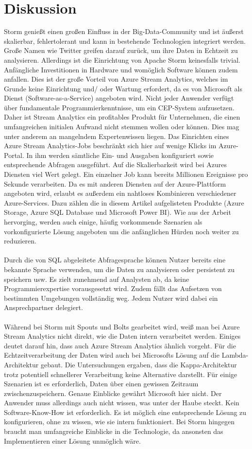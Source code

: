 \section{Diskussion}
Storm genießt einen großen Einfluss in der Big-Data-Community und ist äußerst skalierbar, fehlertolerant und kann in bestehende Technologien integriert werden. Große Namen wie Twitter greifen darauf zurück, um ihre Daten in Echtzeit zu analysieren. Allerdings ist die Einrichtung von Apache Storm keinesfalls trivial. Anfängliche Investitionen in Hardware und womöglich Software können zudem anfallen. Dies ist der große Vorteil von Azure Stream Analytics, welches im Grunde keine Einrichtung und/ oder Wartung erfordert, da es von Microsoft als Dienst (Software-as-a-Service) angeboten wird. Nicht jeder Anwender verfügt über fundamentale Programmierkenntnisse, um ein CEP-System aufzusetzen. Daher ist Stream Analytics ein profitables Produkt für Unternehmen, die einen umfangreichen initialen Aufwand nicht stemmen wollen oder können. Dies mag unter anderem an mangelndem Expertenwissen liegen. Das Einrichten eines Azure Stream Analytics-Jobs beschränkt sich hier auf wenige Klicks im Azure-Portal. In ihm werden sämtliche Ein- und Ausgaben konfiguriert sowie entsprechende Abfragen ausgeführt. Auf die Skalierbarkeit wird bei Azures Diensten viel Wert gelegt. Ein einzelner Job kann bereits Millionen Ereignisse pro Sekunde verarbeiten. Da es mit anderen Diensten auf der Azure-Plattform angeboten wird, erlaubt es außerdem ein nahtloses Kombinieren verschiedener Azure-Services. Dazu zählen die in diesem Artikel aufgelisteten Produkte (Azure Storage, Azure SQL Database und Microsoft Power BI). Wie aus der Arbeit hervorging, werden auch einige, häufig vorkommende Szenarien als vorkonfigurierte Lösung angeboten um die anfänglichen Hürden noch weiter zu reduzieren.\\ \\
Durch die von SQL abgeleitete Abfragesprache können Nutzer bereits eine bekannte Sprache verwenden, um die Daten zu analysieren oder persistent zu speichern usw. Es zielt zunehmend auf Analysten ab, da keine Programmierexpertise vorausgesetzt wird. Zudem fällt das Aufsetzen von bestimmten Umgebungen vollständig weg. Jedem Nutzer wird dabei ein Ansprechpartner delegiert.\\ \\
Während bei Storm mit Spouts und Bolts gearbeitet wird, weiß man bei Azure Stream Analytics nicht direkt, wie die Daten intern verarbeitet werden. Einiges deutet darauf hin, dass auch Azure Stream Analytics ähnlich vorgeht. Für die Echtzeitverarbeitung der Daten wird auch bei Microsofts Lösung auf die Lambda-Architektur gebaut. Die Untersuchungen ergaben, dass die Kappa-Architektur trotz potentiell schnellerer Verarbeitung keine Alternative darstellt. Für einige Szenarien ist es erforderlich, Daten über einen gewissen Zeitraum zwischenzuspeichern. Genaue Einblicke gewährt Microsoft hier nicht. Der Anwender muss allerdings auch nicht wissen, was unter der Haube steckt. Kein Software-Know-How ist erforderlich. Es ist möglich eine entsprechende Lösung zu konfigurieren, ohne zu wissen, wie sie intern funktioniert. Bei Storm hingegen braucht man umfangreiche Einblicke in die Technologie, da ansonsten das Implementieren einer Lösung unmöglich wäre.

